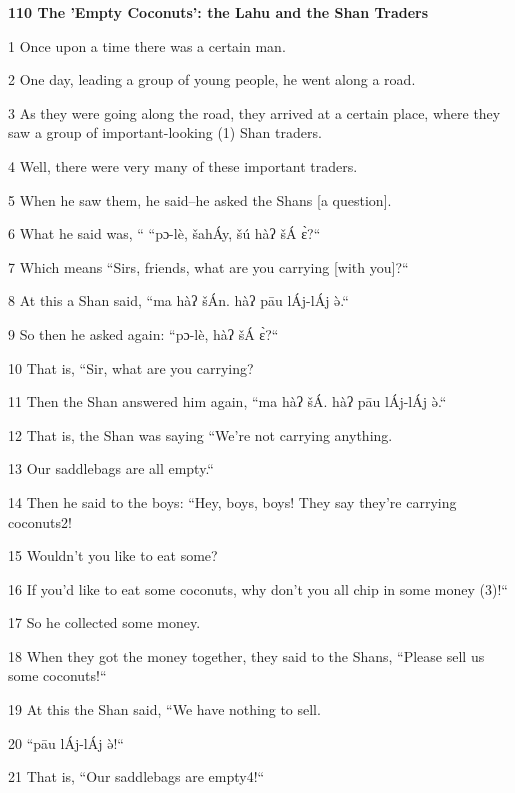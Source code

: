 
\textbf{110 The 'Empty Coconuts': the Lahu and the Shan Traders}

1 Once upon a time there was a certain man.

2 One day, leading a group of young people, he went along a road.

3 As they were going along the road, they arrived at a certain place, where they
saw a group of important-looking (1) Shan traders.

4 Well, there were very many of these important traders.

5 When he saw them, he said--he asked the Shans [a question].

6 What he said was, `` ``pɔ-lè, šahÁy, šú hàʔ šÁ ɛ̀?``

7 Which means ``Sirs, friends, what are you carrying [with you]?``

8 At this a Shan said, ``ma hàʔ šÁn. hàʔ pāu lÁj-lÁj ə̀.``

9 So then he asked again: ``pɔ-lè, hàʔ šÁ ɛ̀?``

10 That is, ``Sir, what are you carrying?

11 Then the Shan answered him again, ``ma hàʔ šÁ. hàʔ pāu lÁj-lÁj
ə̀.``

12 That is, the Shan was saying ``We're not carrying anything.

13 Our saddlebags are all empty.``

14 Then he said to the boys: ``Hey, boys, boys! They say they're carrying
coconuts2!

15 Wouldn't you like to eat some?

16 If you'd like to eat some coconuts, why don't you all chip in some money (3)!``

17 So he collected some money.

18 When they got the money together, they said to the Shans, ``Please sell
us some coconuts!``

19 At this the Shan said, ``We have nothing to sell.

20 ``pāu lÁj-lÁj ə̀!``

21 That is, ``Our saddlebags are empty4!``

